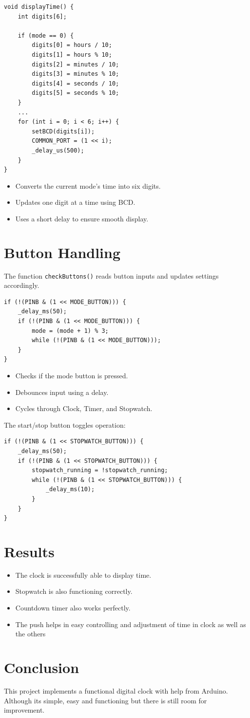 \documentclass[a4paper,12pt]{article}
\begin{document}
\begin{lstlisting}
void displayTime() {
    int digits[6];

    if (mode == 0) { 
        digits[0] = hours / 10;
        digits[1] = hours % 10;
        digits[2] = minutes / 10;
        digits[3] = minutes % 10;
        digits[4] = seconds / 10;
        digits[5] = seconds % 10;
    }
    ...
    for (int i = 0; i < 6; i++) {
        setBCD(digits[i]); 
        COMMON_PORT = (1 << i); 
        _delay_us(500);
    }
}
\end{lstlisting}

\begin{itemize}
    \item Converts the current mode's time into six digits.
    \item Updates one digit at a time using BCD.
    \item Uses a short delay to ensure smooth display.
\end{itemize}

\section*{Button Handling}
The function \texttt{checkButtons()} reads button inputs and updates settings accordingly.

\begin{lstlisting}
if (!(PINB & (1 << MODE_BUTTON))) {
    _delay_ms(50);
    if (!(PINB & (1 << MODE_BUTTON))) {
        mode = (mode + 1) % 3; 
        while (!(PINB & (1 << MODE_BUTTON)));
    }
}
\end{lstlisting}

\begin{itemize}
    \item Checks if the mode button is pressed.
    \item Debounces input using a delay.
    \item Cycles through Clock, Timer, and Stopwatch.
\end{itemize}

The start/stop button toggles operation:

\begin{lstlisting}
if (!(PINB & (1 << STOPWATCH_BUTTON))) {
    _delay_ms(50);
    if (!(PINB & (1 << STOPWATCH_BUTTON))) {
        stopwatch_running = !stopwatch_running;
        while (!(PINB & (1 << STOPWATCH_BUTTON))) {
            _delay_ms(10);
        }
    }
}
\end{lstlisting}

\section{Results}
\begin{itemize}
    \item The clock is successfully able to display time.
    \item Stopwatch is also functioning correctly.
    \item Countdown timer also works perfectly.
    \item The push helps in easy controlling and adjustment of time in clock as well as the others     
\end{itemize}

\section{Conclusion}
This project implements a functional digital clock with help from Arduino. Although its simple, easy and functioning but there is still room for improvement.
\end{document}

